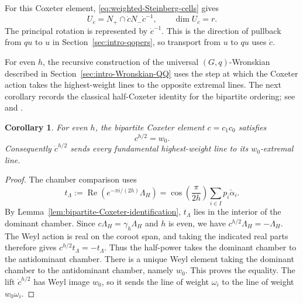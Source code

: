 \documentclass[11pt,leqno]{amsart}
\numberwithin{equation}{section}
\theoremstyle{plain}
\newtheorem{corollary}[theorem]{Corollary}
\theoremstyle{definition}
\theoremstyle{plain}
\theoremstyle{definition}
\theoremstyle{remark}
\begin{document}
For this Coxeter element, \eqref{eq:weighted-Steinberg-cells} gives
\begin{equation}\label{eq:fixed-unipotent-Uc}
 U_c=N_+\cap\dot cN_-\dot c^{-1},\qquad \dim U_c=r.
\end{equation}
The principal rotation is represented by $\dot c^{-1}$.  This is the direction of pullback from $qu$ to $u$ in Section~\ref{sec:intro-qopers}, so transport from $u$ to $qu$ uses $\dot c$.

For even $h$, the recursive construction of the universal $(G,q)$-Wronskian described in Section~\ref{sec:intro-Wronskian-QQ} uses the step at which the Coxeter action takes the highest-weight lines to the opposite extremal lines.  The next corollary records the classical half-Coxeter identity for the bipartite ordering; see \cite{Steinberg1959} and \cite[Section~3.17 and Section~3.19, Exercise~2]{Humphreys1990}.
\begin{corollary}\label{cor:fixed-datum-half-Coxeter}
For even $h$, the bipartite Coxeter element $c=c_1c_0$ satisfies
\begin{equation}\label{eq:fixed-datum-half-Coxeter}
 c^{h/2}=w_0.
\end{equation}
Consequently $\dot c^{h/2}$ sends every fundamental highest-weight line to its $w_0$-extremal line.
\end{corollary}
\begin{proof}
The chamber comparison uses
\[
 t_\Lambda:=\operatorname{Re}\!\left(e^{-\pi i/(2h)}\Lambda_H\right)
 =\cos\!\left(\frac{\pi}{2h}\right)\sum_{i\in I}p_i\check\alpha_i.
\]
By Lemma~\ref{lem:bipartite-Coxeter-identification}, $t_\Lambda$ lies in the interior of the dominant chamber.  Since
$c\Lambda_H=\gamma_h\Lambda_H$ and $h$ is even, we have
$c^{h/2}\Lambda_H=-\Lambda_H$.  The Weyl action is real on the coroot span, and taking the indicated real parts therefore gives
$c^{h/2}t_\Lambda=-t_\Lambda$.  Thus the half-power takes the dominant chamber to the antidominant chamber.  There is a unique Weyl element taking the dominant chamber to the antidominant chamber, namely $w_0$.  This proves the equality.  The lift $\dot c^{h/2}$ has Weyl image $w_0$, so it sends the line of weight $\omega_i$ to the line of weight $w_0\omega_i$.
\end{proof}
\end{document}

